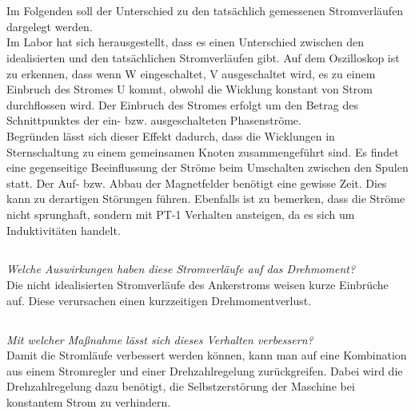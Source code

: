 \chapter{}\label{ch:auf6}
\section{}\label{sec:6a}
Im Folgenden soll der Unterschied zu den tatsächlich gemessenen Stromverläufen dargelegt werden.\\ 
Im Labor hat sich herausgestellt, dass es einen Unterschied zwischen den idealisierten und den tatsächlichen Stromverläufen gibt. Auf dem Oszilloskop ist zu erkennen, dass wenn W eingeschaltet, V ausgeschaltet wird, es zu einem Einbruch des Stromes U kommt, obwohl die Wicklung konstant von Strom durchflossen wird. Der Einbruch des Stromes erfolgt um den Betrag des Schnittpunktes der ein- bzw. ausgeschalteten Phasenströme. \\
Begründen lässt sich dieser Effekt dadurch, dass die Wicklungen in Sternschaltung zu einem gemeinsamen Knoten zusammengeführt sind. Es findet eine gegenseitige Beeinflussung der Ströme beim Umschalten zwischen den Spulen statt. Der Auf- bzw. Abbau der Magnetfelder benötigt eine gewisse Zeit. Dies kann zu derartigen Störungen führen. Ebenfalls ist zu bemerken, dass die Ströme nicht sprunghaft, sondern mit PT-1 Verhalten ansteigen, da es sich um Induktivitäten handelt.

\section{}\label{sec:6b}
\textit{Welche Auswirkungen haben diese Stromverläufe auf das Drehmoment?}\\
Die nicht idealisierten Stromverläufe des Ankerstroms weisen kurze Einbrüche auf. Diese verursachen einen kurzzeitigen Drehmomentverlust.

\section{}\label{sec:6c}
\textit{Mit welcher Maßnahme lässt sich dieses Verhalten verbessern?}\\
Damit die Stromläufe verbessert werden können, kann man auf eine Kombination aus einem Stromregler und einer Drehzahlregelung zurückgreifen. Dabei wird die Drehzahlregelung dazu benötigt, die Selbstzerstörung der Maschine bei konstantem Strom zu verhindern.
